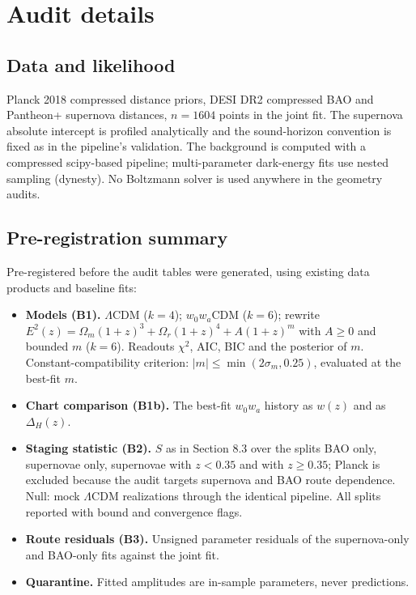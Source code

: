 \hypertarget{appendix-b-audit-details}{%
\section{Audit details}\label{appendix-b-audit-details}}

\hypertarget{b.1-data-and-likelihood}{%
\subsection{Data and likelihood}\label{b.1-data-and-likelihood}}

Planck 2018 compressed distance priors, DESI DR2 compressed BAO and
Pantheon+ supernova distances, \(n=1604\) points in the joint fit. The
supernova absolute intercept is profiled analytically and the
sound-horizon convention is fixed as in the pipeline's validation. The
background is computed with a compressed scipy-based pipeline;
multi-parameter dark-energy fits use nested sampling (dynesty). No
Boltzmann solver is used anywhere in the geometry audits.

\hypertarget{b.2-pre-registration-summary}{%
\subsection{Pre-registration
summary}\label{b.2-pre-registration-summary}}

Pre-registered before the audit tables were generated, using existing
data products and baseline fits:

\begin{itemize}
\tightlist
\item
  \textbf{Models (B1).} \(\Lambda\)CDM (\(k=4\)); \(w_0w_a\)CDM
  (\(k=6\)); rewrite \(E^2(z)=\Omega_m(1+z)^3+\Omega_r(1+z)^4+A(1+z)^m\)
  with \(A\ge0\) and bounded \(m\) (\(k=6\)). Readouts \(\chi^2\), AIC,
  BIC and the posterior of \(m\). Constant-compatibility criterion:
  \(|m|\le\min(2\sigma_m,0.25)\), evaluated at the best-fit \(m\).
\item
  \textbf{Chart comparison (B1b).} The best-fit \(w_0w_a\) history as
  \(w(z)\) and as \(\Delta_H(z)\).
\item
  \textbf{Staging statistic (B2).} \(S\) as in Section 8.3 over the
  splits BAO only, supernovae only, supernovae with \(z<0.35\) and with
  \(z\ge0.35\); Planck is excluded because the audit targets supernova
  and BAO route dependence. Null: mock \(\Lambda\)CDM realizations
  through the identical pipeline. All splits reported with bound and
  convergence flags.
\item
  \textbf{Route residuals (B3).} Unsigned parameter residuals of the
  supernova-only and BAO-only fits against the joint fit.
\item
  \textbf{Quarantine.} Fitted amplitudes are in-sample parameters, never
  predictions.
\end{itemize}

